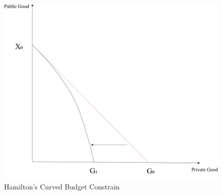 \clearpage

\begin{figure}[H]
    \centering
    \includegraphics[scale=0.4]{Chapter-4/Figures/budget constrain distortion.jpg}
    \caption[Hamilton's Curved Budget Constraint]{Hamilton's Curved Budget Constrain
        \texttt{} }
    \label{Figure 3.4}
\end{figure}

\clearpage

